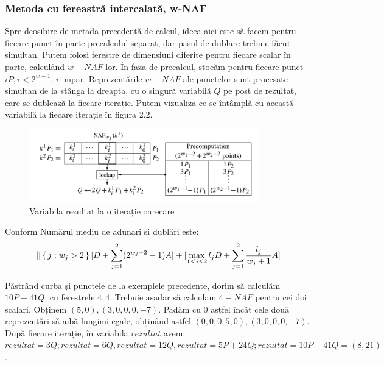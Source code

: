 \subsubsection{Metoda cu fereastră intercalată, w-NAF}

Spre deosibire de metada precedentă de calcul, ideea aici este să facem pentru fiecare punct în parte precalculul separat, dar pasul de dublare trebuie făcut simultan. Putem folosi ferestre de dimensiuni diferite pentru fiecare scalar în parte, calculând $w-NAF$ lor. În faza de precalcul, stocăm pentru fiecare punct $iP, i<2^{w-1}$, $i$ impar. Reprezentările $w-NAF$ ale punctelor sunt procesate simultan de la stânga la dreapta, cu o singură variabilă $Q$ pe post de rezultat, care se dublează la fiecare iterație. Putem vizualiza ce se întâmplă cu această variabilă la fiecare iterație  în figura 2.2.

\begin{figure}[htp]
\centering
\includegraphics[width=10cm]{chapters/interleaving.png}
\caption{Variabila rezultat la o iterație oarecare}
\label{fig:lion}
\end{figure}

\begin{obs}

Conform \cite{interleaving} Numărul mediu de adunari si dublări este:
$$[|\set{j:w_j>2}|D+\sum_{j=1}^{2}(2^{w_j-2}-1)A]+[\max_{1\leq j\leq 2} l_jD + \sum_{j=1}^{2}\frac{l_j}{w_j+1}A]$$
\end{obs}

\begin{ex}
Păstrând curba și punctele de la exemplele precedente, dorim să calculăm $10P + 41Q$, cu ferestrele $4, 4$. Trebuie așadar să calculam $4-NAF$ pentru cei doi scalari. Obținem $(5, 0), (3, 0, 0, 0, -7)$. Padăm cu 0 astfel încât cele două reprezentări să aibă lungimi egale, obținând astfel $(0, 0, 0, 5, 0), (3, 0, 0, 0, -7)$. După fiecare iterație, în variabila $rezultat$ avem: $rezultat = 3Q; rezultat = 6Q, rezultat=12Q, rezultat = 5P + 24Q; rezultat = 10P + 41Q = (8, 21)$.
\end{ex}




